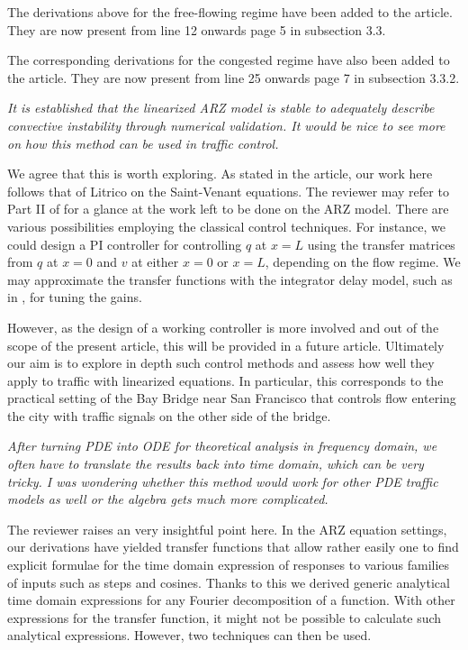 \documentclass{article}
\begin{document}
The derivations above for the free-flowing regime have been added to the article. They are now present from line 12 onwards page 5 in subsection 3.3.

The corresponding derivations for the congested regime have also been added to the article. They are now present from line 25 onwards page 7 in subsection 3.3.2.

\bigskip{}

\emph{
It is established that the linearized ARZ model is stable to adequately describe convective instability through numerical validation. It would be nice to see more on how this method can be used in traffic control.
}

We agree that this is worth exploring. As stated in the article, our work here follows that of Litrico on the Saint-Venant equations. The reviewer may refer to Part II of \cite{Litricobook} for a glance at the work left to be done on the ARZ model. There are various possibilities employing the classical control techniques. For instance, we could design a PI controller for controlling $q$ at $x = L$ using the transfer matrices from $q$ at $x = 0$ and $v$ at either $x = 0$ or $x = L$, depending on the flow regime. We may approximate the transfer functions with the integrator delay model, such as in \cite{Litricosimp}, for tuning the gains. 

However, as the design of a working controller is more involved and out of the scope of the present article, this will be provided in a future article. Ultimately our aim is to explore in depth such control methods and assess how well they apply to traffic with linearized equations. In particular, this corresponds to the practical setting of the Bay Bridge near San Francisco that controls flow entering the city with traffic signals on the other side of the bridge. \\

\bigskip{}

\emph{
After turning PDE into ODE for theoretical analysis in frequency domain, we often have to translate the results back into time domain, which can be very tricky. I was wondering whether this method would work for other PDE traffic models as well or the algebra gets much more complicated.
}

The reviewer raises an very insightful point here. In the ARZ equation settings, our derivations have yielded transfer functions that allow rather easily one to find explicit formulae for the time domain expression of responses to various families of inputs such as steps and cosines. Thanks to this we derived generic analytical time domain expressions for any Fourier decomposition of a function.
With other expressions for the transfer function, it might not be possible to calculate such analytical expressions. However, two techniques can then be used.
\end{document}
